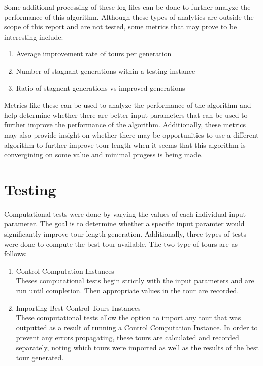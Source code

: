 \documentclass[12pt]{article}
\begin{document}
Some additional processing of these log files can be done to further analyze the performance of this algorithm. Although these types of analytics are outside the scope of this report and are not tested, some metrics that may prove to be interesting include:
\begin{enumerate}
  \item Average improvement rate of tours per generation
  \item Number of stagnant generations within a testing instance
  \item Ratio of stagnent generations vs improved generations
\end{enumerate}

Metrics like these can be used to analyze the performance of the algorithm and help determine whether there are better input parameters that can be used to further improve the performance of the algorithm. Additionally, these metrics may also provide insight on whether there may be opportunities to use a different algorithm to further improve tour length when it seems that this algorithm is convergining on some value and minimal progess is being made.\\

\section{Testing}

Computational tests were done by varying the values of each individual input parameter. The goal is to determine whether a specific input paramter would significantly improve tour length generation. Additionally, three types of tests were done to compute the best tour available. The two type of tours are as follows:
\begin{enumerate}
  \item Control Computation Instances\\

  Theses computational tests begin strictly with the input parameters and are run until completion. Then appropriate values in the tour are recorded.\\

  \item Importing Best Control Tours Instances\\

  These computational tests allow the option to import any tour that was outputted as a result of running a Control Computation Instance. In order to prevent any errors propagating, these tours are calculated and recorded separately, noting which tours were imported as well as the results of the best tour generated.

\end{enumerate}
\end{document}
